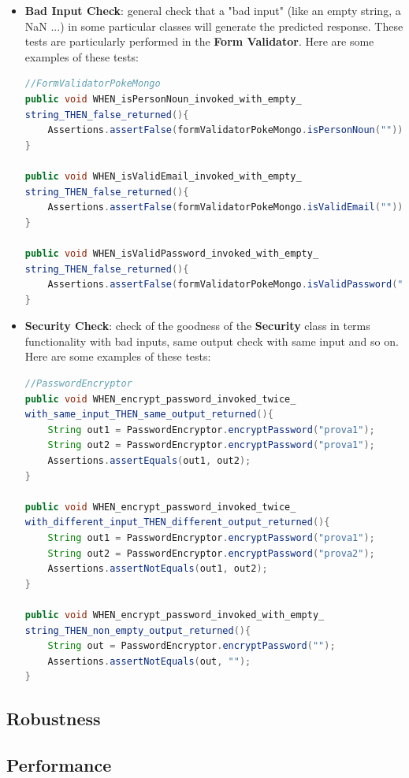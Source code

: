 \begin{itemize}
	\item \textbf{Bad Input Check}: general check that a "bad input" (like an empty string, a NaN ...) in some particular classes will generate the predicted response. These tests are particularly performed in the \textbf{Form Validator}. Here are some examples of these tests:
\begin{lstlisting}[language=Java]
//FormValidatorPokeMongo
public void WHEN_isPersonNoun_invoked_with_empty_
string_THEN_false_returned(){
	Assertions.assertFalse(formValidatorPokeMongo.isPersonNoun(""));
}

public void WHEN_isValidEmail_invoked_with_empty_
string_THEN_false_returned(){
	Assertions.assertFalse(formValidatorPokeMongo.isValidEmail(""));
}

public void WHEN_isValidPassword_invoked_with_empty_
string_THEN_false_returned(){
	Assertions.assertFalse(formValidatorPokeMongo.isValidPassword(""));
}

\end{lstlisting} 
	\item \textbf{Security Check}: check of the goodness of the \textbf {Security} class in terms functionality with bad inputs, same output check with same input and so on. Here are some examples of these tests:
\begin{lstlisting}[language=Java]
//PasswordEncryptor
public void WHEN_encrypt_password_invoked_twice_
with_same_input_THEN_same_output_returned(){
	String out1 = PasswordEncryptor.encryptPassword("prova1");
	String out2 = PasswordEncryptor.encryptPassword("prova1");
	Assertions.assertEquals(out1, out2);
}

public void WHEN_encrypt_password_invoked_twice_
with_different_input_THEN_different_output_returned(){
	String out1 = PasswordEncryptor.encryptPassword("prova1");
	String out2 = PasswordEncryptor.encryptPassword("prova2");
	Assertions.assertNotEquals(out1, out2);
}

public void WHEN_encrypt_password_invoked_with_empty_
string_THEN_non_empty_output_returned(){
	String out = PasswordEncryptor.encryptPassword("");
	Assertions.assertNotEquals(out, "");
}
\end{lstlisting}
\end{itemize}
\subsection{Robustness}
\subsection{Performance}
